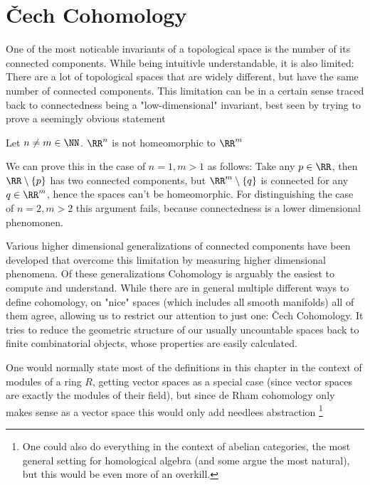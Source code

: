 \chapter{Čech Cohomology}
One of the most noticable invariants of a topological space is the number of its connected components.
While being intuitivle understandable, it is also limited: There are a lot of topological spaces that are
widely different, but have the same number of connected components. This limitation can be in a certain sense
traced back to connectedness being a "low-dimensional" invariant, best seen by trying to prove a seemingly obvious statement
\begin{theorem}
	Let $n \neq m \in \NN$. $\RR^n$ is not homeomorphic to $\RR^m$
\end{theorem}
We can prove this in the case of $n = 1, m > 1$ as follows: Take any $p \in \RR$, then $\RR \setminus \{p\}$ has
two connected components, but $\RR^m \setminus \{q\}$ is connected for any $q \in \RR^m$, hence the spaces can't
be homeomorphic. For distinguishing the case of $n = 2, m > 2$ this argument fails, because connectedness
is a lower dimensional phenomonen.

Various higher dimensional generalizations of connected components have been developed
that overcome this limitation by measuring higher dimensional phenomena. Of these generalizations
Cohomology is arguably the easiest to compute and understand. While there are in general multiple different
ways to define cohomology, on "nice" spaces (which includes all smooth manifolds) all of them agree, allowing
us to restrict our attention to just one: Čech Cohomology. It tries to reduce the geometric structure of our
usually uncountable spaces back to finite combinatorial objects, whose properties are easily calculated.

\begin{remark}
One would normally state most of the definitions in this chapter in
the context of modules of a ring $R$, getting vector spaces as a special
case (since vector spaces are exactly the modules of their field),
but since de Rham cohomology only makes sense as a vector space this
would only add needlees abstraction \footnote{
	One could also do everything in the context of abelian categories,
	the most general setting for homological algebra
	(and some argue the most natural), but this would be even more of an
	overkill.
}
\end{remark}

